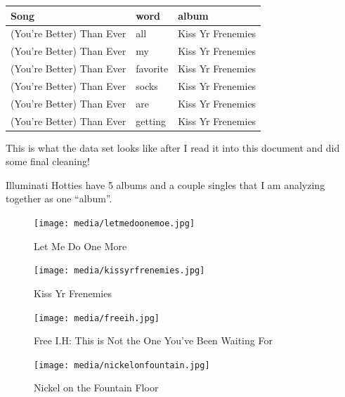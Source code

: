 \documentclass[
  letterpaper,
  DIV=11,
  numbers=noendperiod]{scrartcl}
\begin{document}
\begin{longtable}[]{@{}lll@{}}
\toprule\noalign{}
Song & word & album \\
\midrule\noalign{}
\endhead
\bottomrule\noalign{}
\endlastfoot
(You're Better) Than Ever & all & Kiss Yr Frenemies \\
(You're Better) Than Ever & my & Kiss Yr Frenemies \\
(You're Better) Than Ever & favorite & Kiss Yr Frenemies \\
(You're Better) Than Ever & socks & Kiss Yr Frenemies \\
(You're Better) Than Ever & are & Kiss Yr Frenemies \\
(You're Better) Than Ever & getting & Kiss Yr Frenemies \\
\end{longtable}

This is what the data set looks like after I read it into this document
and did some final cleaning!

Illuminati Hotties have 5 albums and a couple singles that I am
analyzing together as one ``album''.

\begin{figure}[H]

{\centering \texttt{[image: media/letmedoonemoe.jpg]}

}

\caption{Let Me Do One More}

\end{figure}%

\begin{figure}[H]

{\centering \texttt{[image: media/kissyrfrenemies.jpg]}

}

\caption{Kiss Yr Frenemies}

\end{figure}%

\begin{figure}[H]

{\centering \texttt{[image: media/freeih.jpg]}

}

\caption{Free I.H: This is Not the One You've Been Waiting For}

\end{figure}%

\begin{figure}[H]

{\centering \texttt{[image: media/nickelonfountain.jpg]}

}

\caption{Nickel on the Fountain Floor}

\end{figure}%
\end{document}
